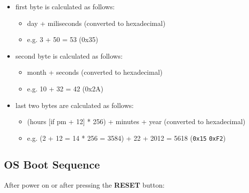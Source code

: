 \documentclass[a4paper,11pt]{article}
\begin{document}
    \begin{itemize}
        \item first byte is calculated as follows:
        \begin{itemize}
            \item day + miliseconds (converted to hexadecimal)
            \item e.g. 3 + 50 = 53 (0x35)
        \end{itemize}
        \item second byte is calculated as follows:
        \begin{itemize}
            \item month + seconds (converted to hexadecimal)
            \item e.g. 10 + 32 = 42 (0x2A)
        \end{itemize}
        \item last two bytes are calculated as follows:
        \begin{itemize}
            \item (hours [if pm + 12] * 256) + minutes + year (converted to
            hexadecimal)
            \item e.g. (2 + 12 = 14 * 256 = 3584) + 22 + 2012 = 5618
            (\texttt{0x15} \texttt{0xF2})
        \end{itemize}
    \end{itemize}

    \subsection{OS Boot Sequence}
    After power on or after pressing the \textbf{RESET} button:
\end{document}
